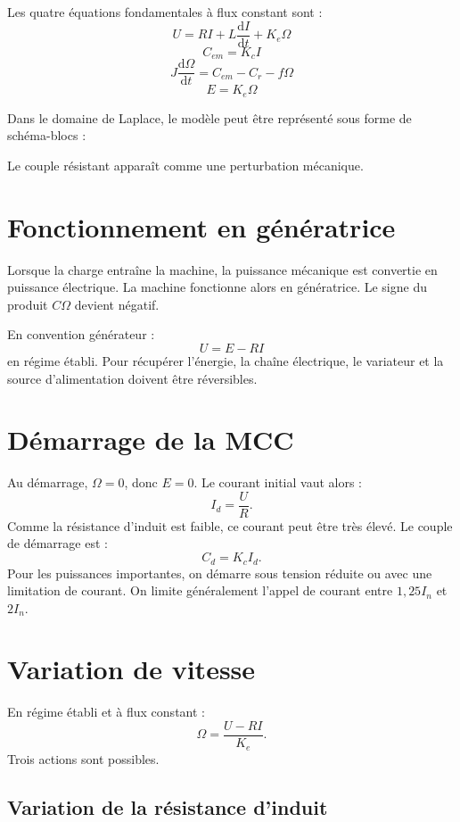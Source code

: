 \TLSchemaInduitMCCVariable

Les quatre équations fondamentales à flux constant sont :
\[
\boxed{U=RI+L\frac{\mathrm dI}{\mathrm dt}+K_e\Omega}
\]
\[
\boxed{C_{em}=K_c I}
\]
\[
\boxed{J\frac{\mathrm d\Omega}{\mathrm dt}=C_{em}-C_r-f\Omega}
\]
\[
\boxed{E=K_e\Omega}
\]

Dans le domaine de Laplace, le modèle peut être représenté sous forme de schéma-blocs :

\TLSchemaBlocMCC

Le couple résistant apparaît comme une perturbation mécanique.

\section{Fonctionnement en génératrice}\label{sec:mcc-generatrice}

Lorsque la charge entraîne la machine, la puissance mécanique est convertie en puissance
électrique. La machine fonctionne alors en génératrice. Le signe du produit $C\Omega$ devient
négatif.

En convention générateur :
\[
U=E-RI
\]
en régime établi. Pour récupérer l'énergie, la chaîne électrique, le variateur et la source
d'alimentation doivent être réversibles.

\section{Démarrage de la MCC}\label{sec:mcc-demarrage}

Au démarrage, $\Omega=0$, donc $E=0$. Le courant initial vaut alors :
\[
I_d=\frac{U}{R}.
\]
Comme la résistance d'induit est faible, ce courant peut être très élevé. Le couple de démarrage
est :
\[
C_d=K_c I_d.
\]
Pour les puissances importantes, on démarre sous tension réduite ou avec une limitation de
courant. On limite généralement l'appel de courant entre $1{,}25I_n$ et $2I_n$.

\section{Variation de vitesse}\label{sec:mcc-variation}

En régime établi et à flux constant :
\[
\Omega=\frac{U-RI}{K_e}.
\]
Trois actions sont possibles.

\subsection{Variation de la résistance d'induit}

